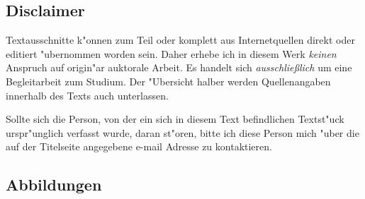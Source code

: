 \documentclass[]{scrartcl}
\begin{document}
\subsection{Disclaimer}

Textausschnitte k"onnen zum Teil oder komplett aus Internetquellen direkt oder editiert "ubernommen worden sein. Daher erhebe ich in diesem Werk \emph{keinen} Anspruch auf origin"ar auktorale Arbeit. Es handelt sich \emph{ausschlie\ss lich} um eine Begleitarbeit zum Studium. Der "Ubersicht halber werden Quellenangaben innerhalb des Texts auch unterlassen. 

Sollte sich die Person, von der ein sich in diesem Text befindlichen Textst"uck urspr"unglich verfasst wurde, daran st"oren, bitte ich diese Person mich "uber die auf der Titelseite angegebene e-mail Adresse zu kontaktieren.
\subsection{Abbildungen}
\end{document}
